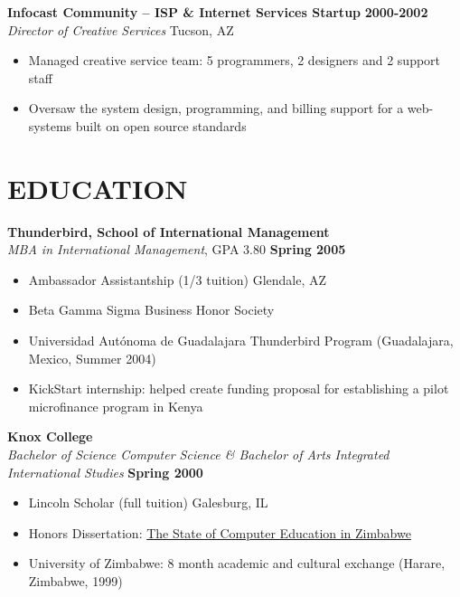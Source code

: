 \documentclass{res}
\begin{document}
\begin{resume}
\textbf{Infocast Community -- ISP \& Internet Services Startup} \hfill \textbf{2000-2002} \\
\emph{Director of Creative Services} \hfill Tucson, AZ
 \begin{itemize} \itemsep -2pt
  \item Managed creative service team: 5 programmers, 2 designers and 2 support staff
  \item Oversaw the system design, programming, and billing support for a web-systems built on open source standards
\end{itemize} \vspace{-6pt}

\section{EDUCATION} 
\vspace{8pt} 
\textbf{Thunderbird, School of International Management}  \\
\emph{MBA in International Management}, GPA 3.80 \hfill \textbf{Spring 2005}
   \begin{itemize} \itemsep -2pt %
		\item Ambassador Assistantship (1/3 tuition)   \hfill Glendale, AZ
		\item Beta Gamma Sigma Business Honor Society
		\item Universidad Autónoma de Guadalajara Thunderbird Program (Guadalajara, Mexico, Summer 2004)  
		\item KickStart internship: helped create funding proposal for establishing a pilot microfinance program in Kenya
	\end{itemize} \vspace{-6pt}

	\vspace{8pt} 
	\textbf{Knox College}  \\
	\emph{Bachelor of Science Computer Science \& Bachelor of Arts Integrated International Studies} \hfill \textbf{Spring 2000}
	   \begin{itemize} \itemsep -2pt %
			\item Lincoln Scholar (full tuition)   \hfill Galesburg, IL
			\item Honors Dissertation: \underline{The State of Computer Education in Zimbabwe} 
			\item University of Zimbabwe: 8 month academic and cultural exchange (Harare, Zimbabwe, 1999)
		\end{itemize}



\end{resume}
\end{document}
